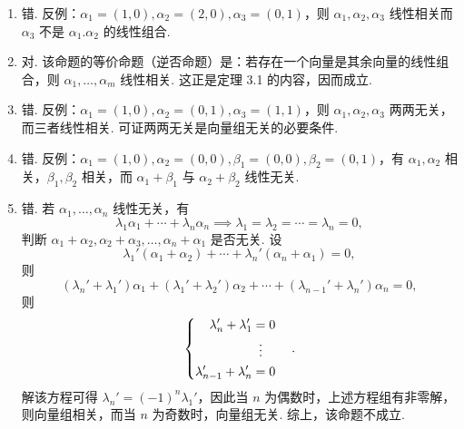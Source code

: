 \begin{exercise}
\begin{exgroup}
\begin{enumerate}
        \end{enumerate}
        \begin{answer}
            \begin{enumerate}
                \item 错. 反例：$\alpha_1=(1,0),\alpha_2=(2,0),\alpha_3=(0,1)$，则 $\alpha_1,\alpha_2,\alpha_3$ 线性相关而 $\alpha_3$ 不是 $\alpha_1.\alpha_2$ 的线性组合.

                \item 对. 该命题的等价命题（逆否命题）是：若存在一个向量是其余向量的线性组合，则 $\alpha_1,\ldots,\alpha_m$ 线性相关. 这正是定理 3.1 的内容，因而成立.

                \item 错. 反例：$\alpha_1=(1,0),\alpha_2=(0,1),\alpha_3=(1,1)$，则 $\alpha_1,\alpha_2,\alpha_3$ 两两无关，而三者线性相关. 可证两两无关是向量组无关的必要条件.

                \item 错. 反例：$\alpha_1=(1,0),\alpha_2=(0,0),\beta_1=(0,0),\beta_2=(0,1)$，有 $\alpha_1,\alpha_2$ 相关，$\beta_1,\beta_2$ 相关，而 $\alpha_1+\beta_1$ 与 $\alpha_2+\beta_2$ 线性无关.

                \item 错. 若 $\alpha_1,\ldots,\alpha_n$ 线性无关，有
                    \[\lambda_1\alpha_1+\cdots+\lambda_n\alpha_n\implies\lambda_1=\lambda_2=\cdots=\lambda_n=0,\]
                    判断 $\alpha_1+\alpha_2,\alpha_2+\alpha_3,\ldots,\alpha_n+\alpha_1$ 是否无关. 设
                    \[\lambda_1'(\alpha_1+\alpha_2)+\cdots+\lambda_n'(\alpha_n+\alpha_1)=0,\]
                    则
                    \[(\lambda_n'+\lambda_1')\alpha_1+(\lambda_1'+\lambda_2')\alpha_2+\cdots+(\lambda_{n-1}'+\lambda_{n}')\alpha_n=0,\]
                    则
                    \[\begin{cases} \begin{aligned}
                                \lambda_n'+\lambda_1'       & = 0               \\
                                                            & \vdotswithin{ = } \\
                                \lambda_{n-1}'+\lambda_{n}' & = 0               \\
                            \end{aligned} \end{cases}.\]
                    解该方程可得 $\lambda_n'=(-1)^n\lambda_1'$，因此当 $n$ 为偶数时，上述方程组有非零解，则向量组相关，而当 $n$ 为奇数时，向量组无关. 综上，该命题不成立.


\end{enumerate}
\end{answer}
\end{exgroup}
\end{exercise}
